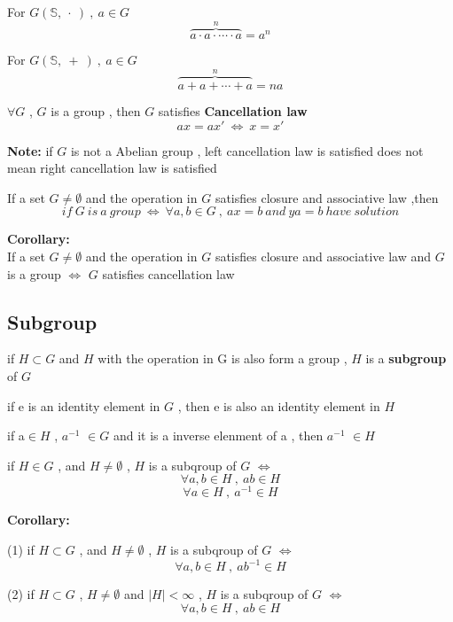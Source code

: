 \documentclass{ctexart}
\begin{document}
\vspace{12 pt}
For \(G(\mathbb{S},\ \cdot \ )\ , \ a\in G\) 
\[\overbrace{a\cdot a\cdot \cdots \cdot a}^{n}=a^n\]

For \(G(\mathbb{S},\ + \ )\ , \ a\in G\) 
\[\overbrace{a+a+\cdots+a}^{n}=na\]

\vspace{12 pt}
\(\forall G\) , \(G\) is a group , then \(G\) satisfies \textbf{Cancellation law}
\[ax=ax'\ \Leftrightarrow\ x=x' \]

\textbf{Note: }if \(G\) is not a Abelian group , left cancellation law is satisfied does not mean right cancellation law is satisfied

\vspace{12 pt}
If a set \(G\neq \emptyset\) and the operation in \(G\) satisfies closure and associative law ,then
\[if\ G\ is\ a\ group\ \Leftrightarrow \ \forall a,b\in G\ , \ ax=b\ and\ ya=b\ have\ solution\]

\textbf{Corollary:}
\\If a set \(G\neq \emptyset\) and the operation in \(G\) satisfies closure and associative law and \(G\) is a group \(\Leftrightarrow\) \(G\) satisfies cancellation law

\subsection{Subgroup}
if \(H\subset G\) and \(H\) with the operation in G is also form a group , \(H\) is a \textbf{subgroup} of \(G\)

\vspace{12 pt}
 if e is an identity element in \(G\) , then e is also an identity element in \(H\)

 if a\(\in H\) , \(a^{-1}\) \(\in G\) and it is a inverse elenment of a , then \(a^{-1}\) \(\in H\) 

\vspace{12 pt}
if \(H \in G\) , and \(H\neq \emptyset\) , \(H\) is a subqroup of \(G\) \(\Leftrightarrow\)
\[\forall a,b\in H\ ,\ ab\in H\]
\[\forall a\in H\ ,\ a^{-1}\in H\]

\vspace{12 pt}
\textbf{Corollary:}

(1) if \(H \subset G\) , and \(H\neq \emptyset\) , \(H\) is a subqroup of \(G\) \(\Leftrightarrow\)
\[\forall a,b\in H\ ,\ ab^{-1}\in H \]

(2) if \(H \subset G\) , \(H\neq \emptyset\) and \(\vert H \vert <\infty\) , \(H\) is a subqroup of \(G\) \(\Leftrightarrow\)
\[\forall a,b\in H\ ,\ ab\in H \]
\end{document}
